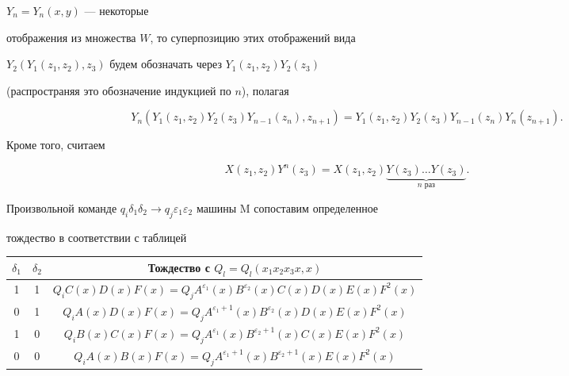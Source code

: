 $Y_n=Y_n(x,y)$ --- некоторые  


отображения из множества $W$, то суперпозицию этих отображений вида  


$Y_2(Y_1(z_1,z_2),z_3)$ будем обозначать через $Y_1(z_1,z_2)Y_2(z_3)$ 


(распространяя это обозначение индукцией по $n$), полагая 


$$ 


Y_n(Y_1(z_1,z_2)Y_2(z_3)Y_{n-1}(z_n),z_{n+1})= 


Y_1(z_1,z_2)Y_2(z_3)Y_{n-1}(z_n)Y_n(z_{n+1}). 


$$ 


Кроме того, считаем 


$$ 


X(z_1,z_2)Y^n(z_3)=X(z_1,z_2) 


\underbrace{Y(z_3)\dotsc Y(z_3)}_{n\text{ раз}}. 


$$ 


 


Произвольной команде $q_i\delta_1\delta_2\to 


q_j\varepsilon_1\varepsilon_2$ машины M сопоставим определенное  


тождество в соответствии с таблицей 


\medskip 





\begin{center} 


\begin{tabular}{|c|c|c|} 


\hline 


$\delta_1$ & $\delta_2$ & Тождество с $Q_l=Q_l(x_1x_2x_3x,x)$ \\ 


\hline 


1 & 1 & $Q_i C(x)D(x)F(x)=Q_j A^{\varepsilon_1}(x) 


B^{\varepsilon_2}(x)C(x)D(x)E(x)F^2(x)$ \\ 


\hline 


0 & 1 & $Q_i A(x)D(x)F(x)=Q_j A^{\varepsilon_1+1}(x) 


B^{\varepsilon_2}(x)D(x)E(x)F^2(x)$ \\ 


\hline 


1 & 0 & $Q_i B(x)C(x)F(x)=Q_j A^{\varepsilon_1}(x) 


B^{\varepsilon_2+1}(x)C(x)E(x)F^2(x)$ \\ 


\hline 


0 & 0 & $Q_i A(x)B(x)F(x)=Q_j A^{\varepsilon_1+1}(x) 


B^{\varepsilon_2+1}(x)E(x)F^2(x)$\\ 


\hline 


\end{tabular} 


\end{center} 


